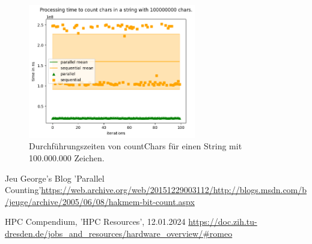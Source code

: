 \documentclass[plainarticle,zihtitle,german,final,hyperref,utf8]{zihpub}
\begin{document}
\newpage
\begin{figure}[h]
	\begin{center}
		\includegraphics[width=0.65\textwidth]{images/comp_count_100000000.png}
		\caption{Durchführungszeiten von countChars für einen String mit 100.000.000 Zeichen.}
		\label{fig:count_comp_100M}
	\end{center}
\end{figure}

\newpage
\begin{thebibliography}{9}
	Jeu George's Blog 'Parallel Counting'\newline \url{https://web.archive.org/web/20151229003112/http://blogs.msdn.com/b/jeuge/archive/2005/06/08/hakmem-bit-count.aspx}
	
	HPC Compendium, 'HPC Resources', 12.01.2024\newline
	\url{https://doc.zih.tu-dresden.de/jobs_and_resources/hardware_overview/#romeo}
\end{thebibliography}
\end{document}
